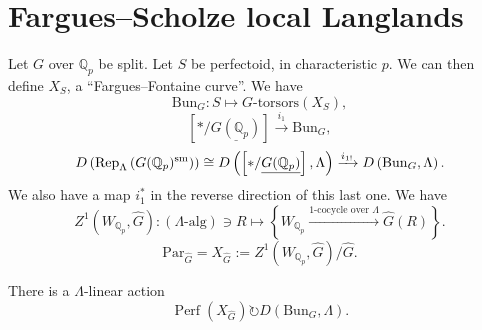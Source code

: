 \documentclass[reqno]{amsart} 
\begin{document}
\section{Fargues--Scholze local Langlands}
Let $G$ over $\mathbb{Q}_p$ be split.  Let $S$ be perfectoid, in characteristic $p$.  We can then define $X_{S}$, a ``Fargues--Fontaine curve''.  We have
\begin{equation*}
  \mathrm{Bun}_G : S \mapsto \text{$G$-torsors}(X_S),
\end{equation*}
\begin{equation*}
  \left[ \ast / \underline{G(\mathbb{Q}_p)} \right] \xrightarrow{i_1} \mathrm{Bun}_G,
\end{equation*}
\begin{equation*}
  D \left( \operatorname{Rep} _{\Lambda} \left( G(\mathbb{Q}_p)^{\mathrm{sm}} \right)  \right)
  \cong D \left( \left[ \ast / \underline{G(\mathbb{Q}_p)} \right], \Lambda \right)
  \xrightarrow{i_{1 !}} D \left( \mathrm{Bun}_G , \Lambda \right).
\end{equation*}
We also have a map $i_1^\ast$ in the reverse direction of this last one.  We have
\begin{equation*}
  Z^1(W_{\mathbb{Q}_p}, \hat{G}) : (\Lambda\text{-alg}) \ni R \mapsto \left\{ W_{\mathbb{Q}_p} \xrightarrow{\text{$1$-cocycle over $\Lambda$}} \hat{G}(R) \right\}.
\end{equation*}
\begin{equation*}
  \mathrm{Par}_{\hat{G}} = X_{\hat{G}} := Z^1 \left( W_{\mathbb{Q}_p}, \hat{G} \right) / \hat{G}.
\end{equation*}

\begin{theorem}
  There is a $\Lambda$-linear action
  \begin{equation*}
    \operatorname{Perf}(X_{\hat{G}})
    \circlearrowright D \left( \mathrm{Bun}_G, \Lambda \right).
  \end{equation*}
\end{theorem}
\end{document}
